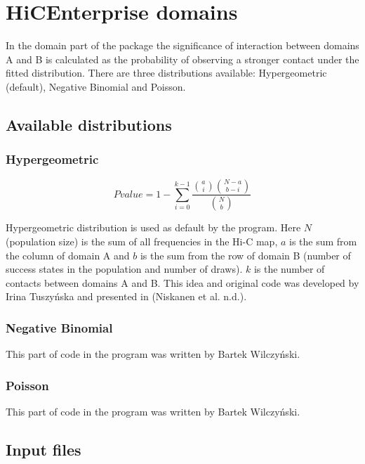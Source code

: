 \chapter{HiCEnterprise domains}
\label{domains}

In the domain part of the package the significance of interaction between domains A and B is calculated as the
probability of observing a stronger contact under the fitted distribution. There are three distributions available:
Hypergeometric (default), Negative Binomial and Poisson.

\section{Available distributions}

\subsection{Hypergeometric}

\begin{equation}
Pvalue = 1 - \sum_{i=0}^{k-1} \frac{{a\choose i}{N-a\choose b-i }}{{N\choose b}}
\end{equation}

Hypergeometric distribution is used as default by the program.
Here $N$ (population size) is the sum of all frequencies in the Hi-C map, $a$ is the sum from the column of domain A and
$b$ is the sum from the row of domain B (number of success states in the population and number of draws). $k$ is the number of contacts between domains A and B. This idea
and original code was developed by Irina Tuszyńska and presented in (Niskanen et al. n.d.).

\subsection{Negative Binomial}
This part of code in the program was written by Bartek Wilczyński.

\subsection{Poisson}
This part of code in the program was written by Bartek Wilczyński.


\section{Input files}
\label{sec:input2}

